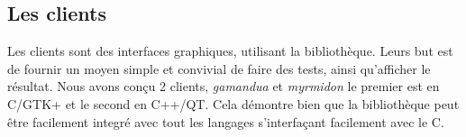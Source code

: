 \subsection{Les clients}
Les clients sont des interfaces graphiques, utilisant la bibliothèque. Leurs but
est de fournir un moyen simple et convivial de faire des tests, ainsi
qu'afficher le résultat. Nous avons conçu 2 clients, {\em gamandua} et {\em
myrmidon} le premier est en C/GTK+ et le second en C++/QT. Cela démontre bien
que la bibliothèque peut être facilement integré avec tout les langages
s'interfaçant facilement avec le C.
